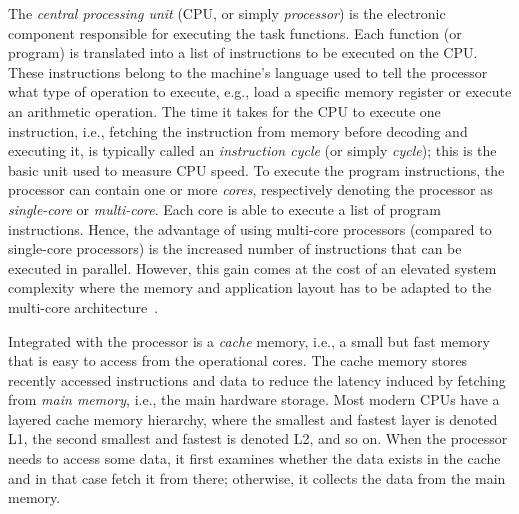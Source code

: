 The \emph{central processing unit} (CPU, or simply \emph{processor}) is the electronic component responsible for executing the task functions.
Each function (or program) is translated into a list of instructions to be executed on the CPU.
These instructions belong to the machine's language used to tell the processor what type of operation to execute, e.g., load a specific memory register or execute an arithmetic operation.
The time it takes for the CPU to execute one instruction, i.e., fetching the instruction from memory before decoding and executing it, is typically called an \emph{instruction cycle} (or simply \emph{cycle}); this is the basic unit used to measure CPU speed.
To execute the program instructions, the processor can contain one or more \emph{cores}, respectively denoting the processor as \emph{single-core} or \emph{multi-core}.
Each core is able to execute a list of program instructions.
Hence, the advantage of using multi-core processors (compared to single-core processors) is the increased number of instructions that can be executed in parallel. 
However, this gain comes at the cost of an elevated system complexity where the memory and application layout has to be adapted to the multi-core architecture~\cite{Brandenburg:2011}.

Integrated with the processor is a \emph{cache} memory, i.e., a small but fast memory that is easy to access from the operational cores.
The cache memory stores recently accessed instructions and data to reduce the latency induced by fetching from \emph{main memory}, i.e., the main hardware storage.
Most modern CPUs have a layered cache memory hierarchy, where the smallest and fastest layer is denoted L1, the second smallest and fastest is denoted L2, and so on.
When the processor needs to access some data, it first examines whether the data exists in the cache and in that case fetch it from there; otherwise, it collects the data from the main memory.

